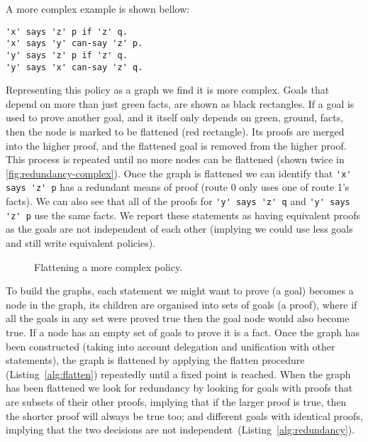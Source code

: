 \documentclass[a4paper]{scrartcl}
\begin{document}
A more complex example is shown bellow:
\begin{lstlisting}
'x' says 'z' p if 'z' q.
'x' says 'y' can-say 'z' p.
'y' says 'z' p if 'z' q.
'y' says 'x' can-say 'z' q.
\end{lstlisting}
Representing this policy as a graph we find it is more complex. Goals that
depend on more than just green facts, are shown as black rectangles.  If a goal
is used to prove another goal, and it itself only depends on green, ground,
facts, then the node is marked to be flattened (red rectangle).  Its proofs are
merged into the higher proof, and the flattened goal is removed from the higher
proof.  This process is repeated until no more nodes can be flattened (shown
twice in \autoref{fig:redundancy-complex}).  Once the graph is flattened we can
identify that \lstinline!'x' says 'z' p! has a redundant means of proof (route
0 only uses one of route 1's facts).  We can also see that all of the proofs for 
\lstinline!'y' says 'z' q! and \lstinline!'y' says 'z' p! use the same facts.
We report these statements as having equivalent proofs as the goals are not
independent of each other (implying we could use less goals and still write
equivalent policies).
\begin{figure}[!H]
  \centering\tiny
  \caption{Flattening a more complex policy.}
  \label{fig:redundancy-complex}
\end{figure}

To build the graphs, each statement we might want to prove (a goal) becomes a node in the graph, its children are organised into sets of goals (a proof), where if all the goals in any set were proved true then the goal node would also become true.
If a node has an empty set of goals to prove it is a fact.
Once the graph has been constructed (taking into account delegation and unification with other statements), the graph is flattened by applying the flatten procedure (Listing~\ref{alg:flatten}) repeatedly until a fixed point is reached.
When the graph has been flattened we look for redundancy by looking for goals with proofs that are subsets of their other proofs, implying that if the larger proof is true, then the shorter proof will always be true too; 
  and different goals with identical proofs, implying that the two decisions are not independent~(Listing~\ref{alg:redundancy}).
\end{document}
